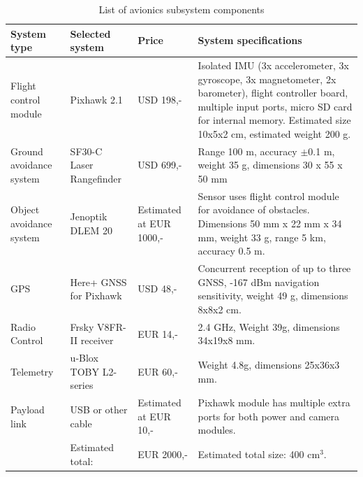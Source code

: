 \begin{table}[h]
    \centering
    \caption{List of avionics subsystem components}
    \label{tab:avio_subs}
    \begin{tabularx}{\textwidth}{>{\small}p{} >{\small}p{} >{\small}p{} L}
    \toprule 
    \textbf{System type}     & \textbf{Selected system} & \textbf{Price} &\textbf{System specifications} 
    \\ \midrule
    Flight control module      & Pixhawk 2.1\footnotemark & USD 198,- & Isolated IMU (3x accelerometer, 3x gyroscope, 3x magnetometer, 2x barometer), flight controller board, multiple input ports, micro SD card for internal memory. Estimated size 10x5x2 cm, estimated weight 200 g. %
    \\ \hdashline
    Ground avoidance system & SF30-C Laser Rangefinder\footnotemark & USD 699,- & Range 100 m, accuracy $\pm$0.1 m, weight 35 g, dimensions 30 x 55 x 50 mm
    \\ \hdashline 
    Object avoidance system & Jenoptik DLEM 20\footnotemark & Estimated at EUR 1000,- & Sensor uses flight control module for avoidance of obstacles. Dimensions 50 mm x 22 mm x 34 mm, weight 33 g, range 5 km, accuracy 0.5 m.
    \\ \hdashline
    GPS & Here+ GNSS for Pixhawk & USD 48,- & Concurrent reception of up to three GNSS, -167 dBm navigation sensitivity, weight 49 g, dimensions 8x8x2 cm.
    \\ \hdashline
    Radio Control & Frsky V8FR-II receiver\footnotemark & EUR 14,- & 2.4 GHz, Weight 39g, dimensions 34x19x8 mm. 
    \\ \hdashline
    Telemetry & u-Blox TOBY L2-series \footnotemark &   EUR 60,- & Weight 4.8g, dimensions 25x36x3 mm.
    \\ \hdashline
    Payload link & USB or other cable & Estimated at EUR 10,- & Pixhawk module has multiple extra ports for both power and camera modules.
    \\ \midrule
     & Estimated total: & EUR 2000,- & Estimated total size: 400 cm$^3$.
    \\ \bottomrule
    \end{tabularx}
\end{table}


\addtocounter{footnote}{-5}

